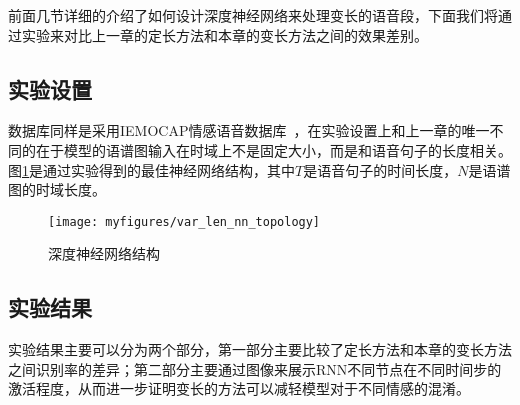 前面几节详细的介绍了如何设计深度神经网络来处理变长的语音段，下面我们将通过实验来对比上一章的定长方法和本章的变长方法之间的效果差别。

\subsection{实验设置}
\label{sec:var_len_experiement_setup}

数据库同样是采用IEMOCAP情感语音数据库~\cite{Busso2008IEMOCAP}，在实验设置上和上一章的唯一不同的在于模型的语谱图输入在时域上不是固定大小，而是和语音句子的长度相关。图\ref{fig:var_len_nn_topology}是通过实验得到的最佳神经网络结构，其中$T$是语音句子的时间长度，$N$是语谱图的时域长度。

\begin{figure}[htb] %
    \vspace{-0cm}  %
    \setlength{\belowcaptionskip}{0cm}   %
    \centering
    \texttt{[image: myfigures/var\_len\_nn\_topology]}
    \caption{深度神经网络结构}
    \label{fig:var_len_nn_topology}
\end{figure}

\subsection{实验结果}
\label{sec:var_len_experiement_result}

实验结果主要可以分为两个部分，第一部分主要比较了定长方法和本章的变长方法之间识别率的差异；第二部分主要通过图像来展示RNN不同节点在不同时间步的激活程度，从而进一步证明变长的方法可以减轻模型对于不同情感的混淆。

